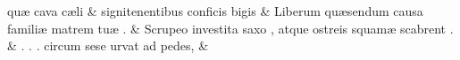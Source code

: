\documentclass[12pt,onecolumn,twoside,a4paper]{memoir}
\begin{document}
               \begin{pairs}
                  \begin{Leftside}
			\beginnumbering
			\setcounter{stanzaL}{0}
                     
                         \stanza {}quæ
                              cava
                              cæli & 
                     signitenentibus
                              conficis
                              bigis \&
                         \stanza {}
                     Liberum
                              quæsendum
                              causa
                              familiæ
                              matrem
                              tuæ
                              . \&
                         \stanza {}
                     Scrupeo
                              investita
                              saxo
                              ,
                              atque
                              ostreis
                              squamæ
                              scabrent
                              . \&
                         \stanza {}.
                              .
                              .
                              circum
                              sese
                              urvat
                              ad
                              pedes, & 
                     

\end{Leftside}
\end{pairs}
\end{document}
